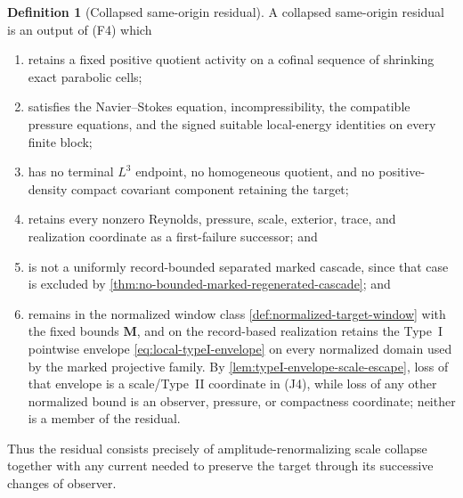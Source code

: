 \documentclass[11pt]{amsart}
\numberwithin{equation}{section}
\theoremstyle{plain}
\theoremstyle{definition}
\newtheorem{definition}[definition]{Definition}
\theoremstyle{remark}
\begin{document}
\begin{definition}[Collapsed same-origin residual]
\label{def:collapsed-same-origin-residual}
A collapsed same-origin residual is an output of \textup{(F4)} which
\begin{enumerate}[label=\textup{(J\arabic*)},leftmargin=2.8em]
\item retains a fixed positive quotient activity on a cofinal sequence of
shrinking exact parabolic cells;
\item satisfies the Navier--Stokes equation, incompressibility, the compatible
pressure equations, and the signed suitable local-energy identities on every
finite block;
\item has no terminal \(L^3\) endpoint, no homogeneous quotient, and no
positive-density compact covariant component retaining the target;
\item retains every nonzero Reynolds, pressure, scale, exterior, trace, and
realization coordinate as a first-failure successor; and
\item is not a uniformly record-bounded separated marked cascade, since that
case is excluded by
\cref{thm:no-bounded-marked-regenerated-cascade}; and
\item remains in the normalized window class
\cref{def:normalized-target-window} with the fixed bounds \(\mathbf M\), and
on the record-based realization retains the Type~I pointwise envelope
\eqref{eq:local-typeI-envelope} on every normalized domain used by the marked
projective family.  By \cref{lem:typeI-envelope-scale-escape}, loss of that
envelope is a scale/Type~II coordinate in \textup{(J4)}, while loss of any
other normalized bound is an observer, pressure, or compactness coordinate;
neither is a member of the residual.
\end{enumerate}
Thus the residual consists precisely of amplitude-renormalizing scale
collapse together with any current needed to preserve the target through its
successive changes of observer.
\end{definition}
\end{document}
